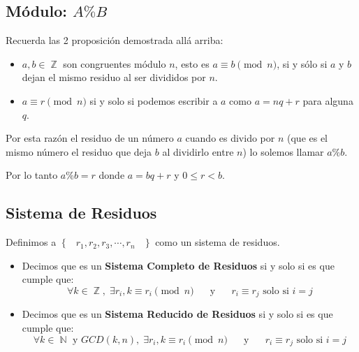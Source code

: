 \documentclass[12pt, fleqn]{report}                             %
\DeclareMathOperator \Space {\quad}                             %
\DeclareMathOperator \MiniSpace {\;}                            %
\newcommand \Also {\Space \text{y} \Space}                      %
\newcommand{\Set}[1]{\left\{ \MiniSpace #1 \MiniSpace \right\}} %
\DeclareMathOperator \Naturals  {\mathbb{N}}                     %
\DeclareMathOperator \Integers  {\mathbb{Z}}                     %
\begin{document}
        \clearpage
        \subsection{Módulo: $A \% B$}

            Recuerda las 2 proposición demostrada allá arriba:

            \begin{itemize}
                \item $a,b \in \Integers$ son congruentes módulo $n$,
                    esto es $a \equiv b \pmod{n}$, si y sólo si $a$ y $b$
                    dejan el mismo residuo al ser divididos por $n$.

                \item $a \equiv r \pmod{n}$ si y solo si podemos escribir
                    a $a$ como $a=nq+r$ para alguna $q$.
             \end{itemize} 

            Por esta razón el residuo de un número $a$ cuando es divido por $n$
            (que es el mismo número el residuo que deja $b$ al dividirlo entre $n$)
            lo solemos llamar $a \% b$.


            Por lo tanto $a \% b = r$ donde $a =bq+r$ y $0 \leq r < b$.


        \clearpage
        \subsection{Sistema de Residuos}

            Definimos a $\Set{r_1, r_2, r_3, \cdots, r_n}$ como un sistema
            de residuos.

            \begin{itemize}
                \item Decimos que es un \textbf{Sistema Completo de Residuos}
                    si y solo si es que cumple que:
                    \begin{equation*}
                        \forall k \in \Integers, \; \exists r_i, k \equiv r_i \pmod{n} 
                        \Also
                        r_i \equiv r_j \text{ solo si } i = j 
                    \end{equation*}

                \item Decimos que es un \textbf{Sistema Reducido de Residuos}
                    si y solo si es que cumple que:
                    \begin{equation*}
                        \forall k \in \Naturals \text{ y } GCD(k, n), \; 
                            \exists r_i, k \equiv r_i \pmod{n} 
                        \Also
                        r_i \equiv r_j \text{ solo si } i = j 
                    \end{equation*}
            \end{itemize}
\end{document}
